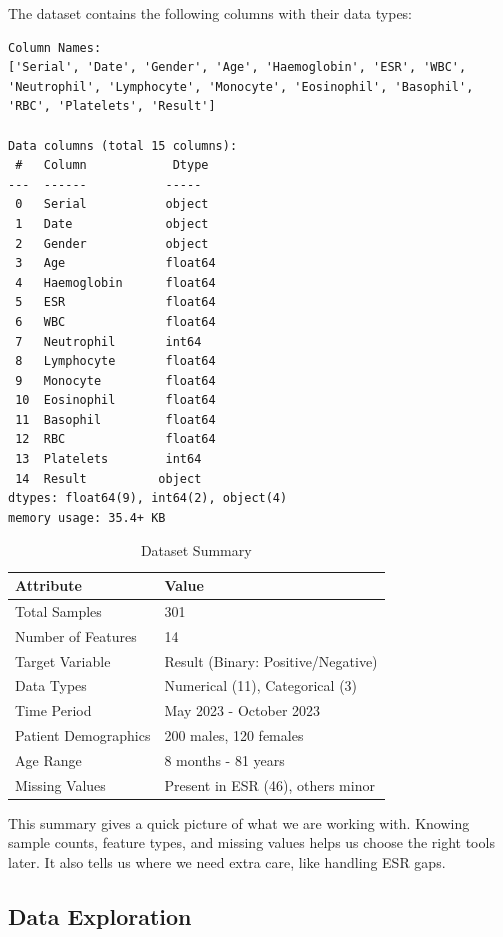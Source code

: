 \documentclass[12pt,a4paper]{article}
\begin{document}
The dataset contains the following columns with their data types:
\begin{verbatim}
Column Names:
['Serial', 'Date', 'Gender', 'Age', 'Haemoglobin', 'ESR', 'WBC', 'Neutrophil', 'Lymphocyte', 'Monocyte', 'Eosinophil', 'Basophil', 'RBC', 'Platelets', 'Result']

Data columns (total 15 columns):
 #   Column            Dtype  
---  ------           -----  
 0   Serial           object 
 1   Date             object 
 2   Gender           object 
 3   Age              float64
 4   Haemoglobin      float64
 5   ESR              float64
 6   WBC              float64
 7   Neutrophil       int64  
 8   Lymphocyte       float64
 9   Monocyte         float64
 10  Eosinophil       float64
 11  Basophil         float64
 12  RBC              float64
 13  Platelets        int64  
 14  Result          object 
dtypes: float64(9), int64(2), object(4)
memory usage: 35.4+ KB
\end{verbatim}

\begin{table}[H]
\centering
\caption{Dataset Summary}
\label{tab:dataset_summary}
\begin{tabular}{@{}ll@{}}
\toprule
\rowcolor{SoftGray!80} \textbf{Attribute} & \textbf{Value} \\
\midrule
Total Samples & 301 \\
Number of Features & 14 \\
Target Variable & Result (Binary: Positive/Negative) \\
Data Types & Numerical (11), Categorical (3) \\
Time Period & May 2023 - October 2023 \\
Patient Demographics & 200 males, 120 females \\
Age Range & 8 months - 81 years \\
Missing Values & Present in ESR (46), others minor \\
\bottomrule
\end{tabular}
\end{table}

This summary gives a quick picture of what we are working with. Knowing sample counts, feature types, and missing values helps us choose the right tools later. It also tells us where we need extra care, like handling ESR gaps.

\subsection{Data Exploration}
\end{document}
